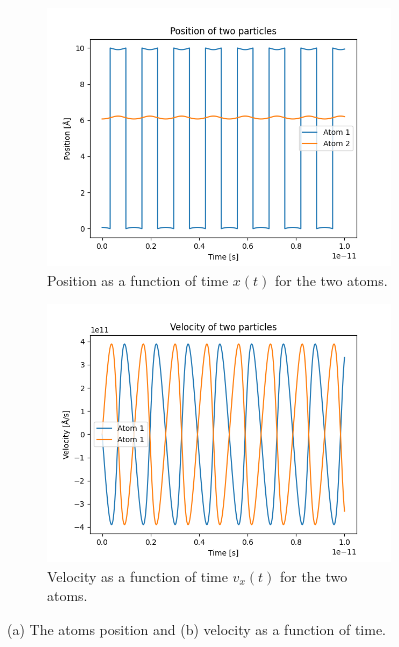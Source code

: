 \documentclass[a4paper]{article}
\begin{document}
\begin{figure}[H]
    \centering
    \begin{subfigure}[b]{0.45\textwidth}
        \centering
        \includegraphics[width=\textwidth]{bsX.png}
        \caption{Position as a function of time $x(t)$ for the two atoms.}
        \label{fig: Position BT}
    \end{subfigure}
    \hfill
    \begin{subfigure}[b]{0.45\textwidth}
        \centering
        \includegraphics[width=\textwidth]{bsV.png}
        \caption{Velocity as a function of time $v_x(t)$ for the two atoms.}
        \label{fig: Velocity BT}
    \end{subfigure}
    \caption{(a) The atoms position and (b) velocity as a function of time.}
    \label{fig: Position & Velocity Bouncing test}
\end{figure}\noindent
\end{document}

